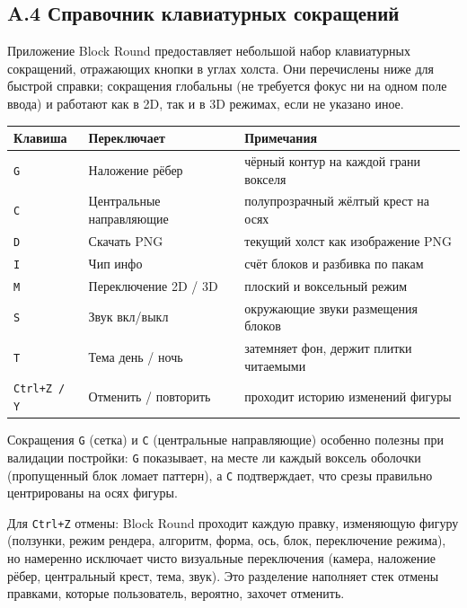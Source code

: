 \documentclass[12pt,a4paper]{scrartcl}
\newcommand{\code}[1]{\texttt{\small #1}}
\begin{document}
\subsection*{A.4 Справочник клавиатурных сокращений}

Приложение Block Round предоставляет небольшой набор клавиатурных сокращений, отражающих кнопки в углах холста. Они перечислены ниже для быстрой справки; сокращения глобальны (не требуется фокус ни на одном поле ввода) и работают как в 2D, так и в 3D режимах, если не указано иное.

\vspace{0.4em}
\begin{center}
\begin{tabular}{@{}lll@{}}
\toprule
\textbf{Клавиша} & \textbf{Переключает} & \textbf{Примечания} \\
\midrule
\code{G} & Наложение рёбер  & чёрный контур на каждой грани вокселя \\
\code{C} & Центральные направляющие  & полупрозрачный жёлтый крест на осях \\
\code{D} & Скачать PNG  & текущий холст как изображение PNG \\
\code{I} & Чип инфо  & счёт блоков и разбивка по пакам \\
\code{M} & Переключение 2D / 3D  & плоский и воксельный режим \\
\code{S} & Звук вкл/выкл  & окружающие звуки размещения блоков \\
\code{T} & Тема день / ночь  & затемняет фон, держит плитки читаемыми \\
\code{Ctrl+Z / Y} & Отменить / повторить  & проходит историю изменений фигуры \\
\bottomrule
\end{tabular}
\end{center}

Сокращения \code{G} (сетка) и \code{C} (центральные направляющие) особенно полезны при валидации постройки: \code{G} показывает, на месте ли каждый воксель оболочки (пропущенный блок ломает паттерн), а \code{C} подтверждает, что срезы правильно центрированы на осях фигуры.

Для \code{Ctrl+Z} отмены: Block Round проходит каждую правку, изменяющую фигуру (ползунки, режим рендера, алгоритм, форма, ось, блок, переключение режима), но намеренно исключает чисто визуальные переключения (камера, наложение рёбер, центральный крест, тема, звук). Это разделение наполняет стек отмены правками, которые пользователь, вероятно, захочет отменить.
\end{document}
